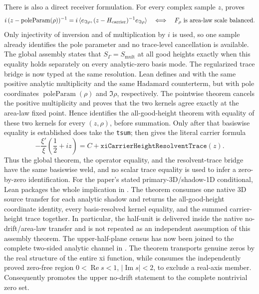 \documentclass[11pt]{article}
\theoremstyle{definition}
\begin{document}
There is also a direct receiver formulation.  For every complex sample \(z\),
 proves
\[
 i\,(z-\operatorname{poleParam}(\rho))^{-1}
 =i\,\langle e_{\Im\rho},(z-H_{\rm carrier})^{-1}e_{\Im\rho}\rangle
 \quad\Longleftrightarrow\quad
 F_\rho\ \text{is area-law scale balanced}.
\]
Only injectivity of inversion and of multiplication by \(i\) is used, so one
sample already identifies the pole parameter and no trace-level cancellation
is available.  The global assembly
states that \(S_\Gamma=S_{\mathrm{mult}}\) at all good heights exactly when
this equality holds separately on every analytic-zero basis mode.
The regularized trace bridge is now typed at the same resolution.  Lean defines
 and  with the
same positive analytic multiplicity and the same Hadamard counterterm, but with
pole coordinates \(\operatorname{poleParam}(\rho)\) and \(\Im\rho\), respectively.
The pointwise theorem
 cancels
the positive multiplicity and proves that the two kernels agree exactly at the
area-law fixed point.  Hence
identifies the all-good-height theorem with equality of these two kernels for
every \((z,\rho)\), before summation.  Only after that basiswise equality is
established does  take the \texttt{tsum};
 then gives
the literal carrier formula
\[
 -\frac{\xi'}{\xi}\!\left(\frac12+iz\right)
   =C+\texttt{xiCarrierHeightResolventTrace}(z).
\]
Thus the global theorem, the operator equality, and the resolvent-trace bridge
have the same basiswise weld, and no scalar trace equality is used to infer a
zero-by-zero identification.
For the paper's stated primary-3D/shadow-1D conditional, Lean packages the
whole implication in
.
The theorem consumes one native 3D source transfer for each analytic shadow
and returns the all-good-height coordinate identity, every basis-resolved
kernel equality, and the summed carrier-height trace together.  In particular,
the half-unit is delivered inside the native no-drift/area-law transfer and is
not repeated as an independent assumption of this assembly theorem.
The upper-half-plane census has now been joined to the complete two-sided analytic
channel in
.
The theorem  transports genuine zeros by the
real structure of the entire xi function, while
 consumes the independently proved zero-free
region \(0<\operatorname{Re}s<1\), \(\lvert\operatorname{Im}s\rvert<2\), to
exclude a real-axis member.  Consequently
 promotes the upper no-drift
statement to the complete nontrivial zero set.
\end{document}

